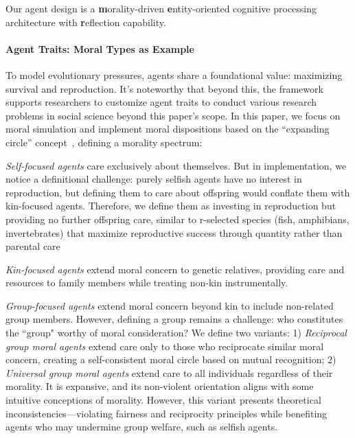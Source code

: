 Our agent design \agentframe is a \textbf{m}orality-driven \textbf{e}ntity-oriented cognitive processing architecture with \textbf{r}eflection capability.

\paragraph{Agent Traits: Moral Types as Example}

To model evolutionary pressures, agents share a foundational value: maximizing survival and reproduction. It's noteworthy that beyond this, the framework supports researchers to customize agent traits to conduct various research problems in social science beyond this paper's scope. In this paper, we focus on moral simulation and implement moral dispositions based on the ``expanding circle'' concept~\citep{singer1981expanding}, defining a morality spectrum:


\textit{Self-focused agents} care exclusively about themselves. But in implementation, we notice a definitional challenge: purely selfish agents have no interest in reproduction, but defining them to care about offspring would conflate them with kin-focused agents. 
Therefore, we define them as investing in reproduction but providing no further offspring care, similar to
r-selected species (fish, amphibians, invertebrates) that maximize reproductive success through quantity rather than parental care~\citep{pianka1970r, stearns1992evolution, gross2005evolution, reznick2002r, trumbo2012patterns}

\textit{Kin-focused agents} extend moral concern to genetic relatives, providing care and resources to family members while treating non-kin instrumentally.

\textit{Group-focused agents} extend moral concern beyond kin to include non-related group members. However, defining a group remains a challenge: who constitutes the ``group" worthy of moral consideration? We define two variants: 1) \textit{Reciprocal group moral agents} extend care only to those who reciprocate similar moral concern, creating a self-consistent moral circle based on mutual recognition; 2) \textit{Universal group moral agents} extend care to all individuals regardless of their morality. It is expansive, and its non-violent orientation aligns with some intuitive conceptions of morality. However, this variant presents theoretical inconsistencies—violating fairness and reciprocity principles while benefiting agents who may undermine group welfare, such as selfish agents.


